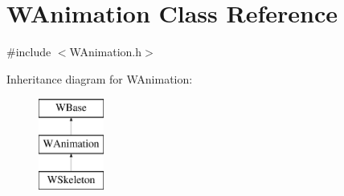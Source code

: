 \hypertarget{class_w_animation}{}\section{W\+Animation Class Reference}
\label{class_w_animation}


{\ttfamily \#include $<$W\+Animation.\+h$>$}

Inheritance diagram for W\+Animation\+:\begin{figure}[H]
\begin{center}
\leavevmode
\includegraphics[height=3.000000cm]{class_w_animation}
\end{center}
\end{figure}
